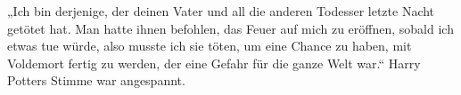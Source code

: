 „Ich bin derjenige, der deinen Vater und all die anderen Todesser letzte Nacht getötet hat. Man hatte ihnen befohlen, das Feuer auf mich zu eröffnen, sobald ich etwas tue würde, also musste ich sie töten, um eine Chance zu haben, mit Voldemort fertig zu werden, der eine Gefahr für die ganze Welt war.“ Harry Potters Stimme war angespannt.
